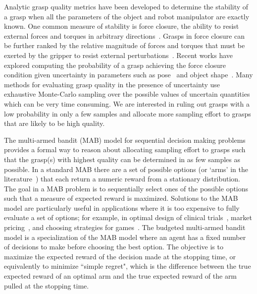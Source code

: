 \documentclass[journal,transmag]{IEEEtran}%
\begin{document}
Analytic grasp quality metrics have been developed to determine the stability of a grasp when all the parameters of the object and robot manipulator are exactly known.
One common measure of stability is force closure, the ability to resist external forces and torques in arbitrary directions~\cite{}.
Grasps in force closure can be further ranked by the relative magnitude of forces and torques that must be exerted by the gripper to resist external perturbations~\cite{ferrari1992}.
Recent works have explored computing the probability of a grasp achieving the force closure condition given uncertainty in parameters such as pose~\cite{christopoulos2007handling, weisz2012pose, kim2012physically} and object shape~\cite{kehoe2012estimating, mahler2015gp}.
Many methods for evaluating grasp quality in the presence of uncertainty use exhaustive Monte-Carlo sampling over the possible values of uncertain quantities~\cite{christopoulos2007handling, kim2012physically, weisz2012pose, kehoe2012estimating, kehoe2012towards} which can be very time consuming.
We are interested in ruling out grasps with a low probability in only a few samples and allocate more sampling effort to grasps that are likely to be high quality.

The multi-armed bandit (MAB) model for sequential decision making problems~\cite{barto1998reinforcement, lai1985asymptotically, robbins1952some} provides a formal way to reason about allocating sampling effort to grasps such that the grasp(s) with highest quality can be determined in as few samples as possible.
In a standard MAB there are a set of possible options (or `arms' in the literature~\cite{barto1998reinforcement}) that each return a numeric reward from a stationary distribution.
The goal in a MAB problem is to sequentially select ones of the possible options such that a measure of expected reward is maximized.
Solutions to the MAB model are particularly useful in applications where it is too expensive to fully evaluate a set of options; for example, in optimal design of clinical trials~\cite{simon1989optimal}, market pricing~\cite{rothschild1974two}, and choosing strategies for games~\cite{st2012online}.
The budgeted multi-armed bandit model \cite{madani2004budgeted} is a specialization of the MAB model where an agent has a fixed number of decisions to make before choosing the best option.
The objective is to maximize the expected reward of the decision made at the stopping time, or equivalently to minimize ``simple regret", which is the difference between the true expected reward of an optimal arm and the true expected reward of the arm pulled at the stopping time.
\end{document}
